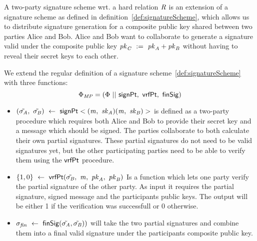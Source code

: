 A two-party signature scheme wrt. a hard relation $\mathit{R}$ is an extension of a signature scheme as defined in definition~\ref{def:signatureScheme}, which allows us to distribute signature generation for a composite public key shared between two parties Alice and Bob.
    Alice and Bob want to collaborate to generate a signature valid under the composite public key $\mathit{pk}_{\mathit{C}} ~:=~ \mathit{pk}_{\mathit{A}} + \mathit{pk}_{\mathit{B}}$ without having to reveal their secret keys to each other.\begin{definition}
    \label{def:twoPartySig}
     We extend the regular definition of a signature scheme~\ref{def:signatureScheme} with three functions:
    \[
        \Phi_{\mathit{MP}} = (\Phi ~||~ \mathsf{signPt} ,~ \mathsf{vrfPt} ,~ \mathsf{finSig})
    \]
    
    \begin{itemize}
        \item $(\tilde{\sigma_{\mathit{A}}} ,~ \tilde{\sigma_{\mathit{B}}}) ~\leftarrow~ \mathsf{signPt}<(\mathit{m} ,~ \mathit{sk}_{\mathit{A}})(\mathit{m} ,~ \mathit{sk}_{\mathit{B}})>$ is defined as a two-party procedure which requires both Alice and Bob to provide their secret key and a message which should be signed. The parties collaborate to both calculate their own partial signatures. These partial signatures do not need to be valid signatures yet, but the other participating parties need to be able to verify them using the $\mathsf{vrfPt}$ procedure.
        \item $\{1,0\} ~\leftarrow~ \mathsf{vrfPt}(\tilde{\sigma_{\mathit{B}}} ,~ \mathit{m} ,~ \mathit{pk}_{\mathit{A}} ,~ \mathit{pk}_{\mathit{B}})$ Is a function which lets one party verify the partial signature of the other party. As input it requires the partial signature, signed message and the participants public keys. The output will be either 1 if the verification was successfull or 0 otherwise.
        \item $\sigma_{\mathit{fin}} ~\leftarrow~ \mathsf{finSig}(\tilde{\sigma_{\mathit{A}}},\tilde{\sigma_{\mathit{B}}}))$ will take the two partial signatures and combine them into a final valid signature under the participants composite public key.
    \end{itemize}
\end{definition}


